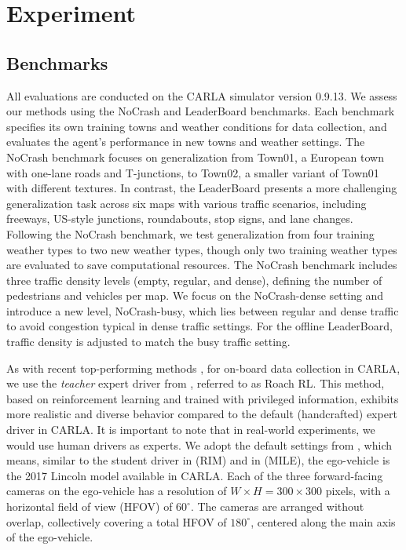 \section{Experiment}
%	

\subsection{Benchmarks} \label{sec:Dataset}

\hspace{1pc}All evaluations are conducted on the CARLA simulator \cite{Dosovitskiy:2017} version 0.9.13. 
We assess our methods using the NoCrash \cite{codevilla2019exploring} and LeaderBoard benchmarks. 
Each benchmark specifies its own training towns and weather conditions for data collection, and evaluates the agent's performance in new towns and weather settings. 
The NoCrash benchmark focuses on generalization from Town01, a European town with one-lane roads and T-junctions, to Town02, a smaller variant of Town01 with different textures. 
In contrast, the LeaderBoard presents a more challenging generalization task across six maps with various traffic scenarios, including freeways, US-style junctions, roundabouts, stop signs, and lane changes. 
Following the NoCrash benchmark\cite{codevilla2019exploring}, we test generalization from four training weather types to two new weather types, though only two training weather types are evaluated to save computational resources. 
The NoCrash benchmark includes three traffic density levels (empty, regular, and dense), defining the number of pedestrians and vehicles per map. 
We focus on the NoCrash-dense setting and introduce a new level, NoCrash-busy, which lies between regular and dense traffic to avoid congestion typical in dense traffic settings. 
For the offline LeaderBoard, traffic density is adjusted to match the busy traffic setting. 


As with recent top-performing methods \cite{Hu:2022}, for on-board data collection in CARLA, we use the \emph{teacher} expert driver from \cite{Zhang:2021}, referred to as Roach RL.
This method, based on reinforcement learning and trained with privileged information, exhibits more realistic and diverse behavior compared to the default (handcrafted) expert driver in CARLA. 
It is important to note that in real-world experiments, we would use human drivers as experts.
We adopt the default settings from \cite{Zhang:2021}, which means, similar to the student driver in \cite{Zhang:2021} (RIM) and in \cite{Hu:2022} (MILE), the ego-vehicle is the 2017 Lincoln model available in CARLA.
Each of the three forward-facing cameras on the ego-vehicle has a resolution of $W\times H=300\times300$ pixels, with a horizontal field of view (HFOV) of $60^{\circ}$.
The cameras are arranged without overlap, collectively covering a total HFOV of $180^{\circ}$, centered along the main axis of the ego-vehicle.


